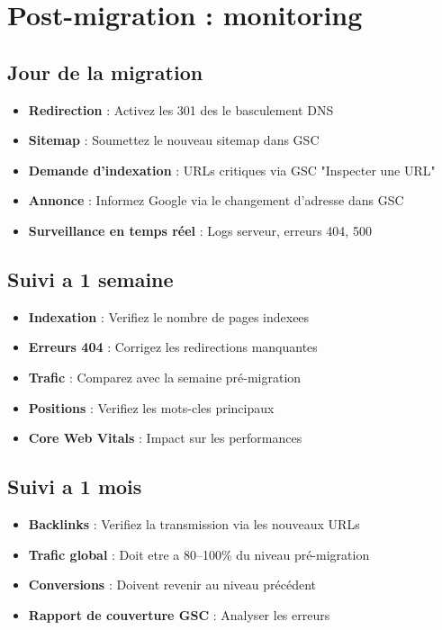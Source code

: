 \section{Post-migration : monitoring}

\subsection{Jour de la migration}

\begin{itemize}
    \item \textbf{Redirection} : Activez les 301 des le basculement DNS
    \item \textbf{Sitemap} : Soumettez le nouveau sitemap dans GSC
    \item \textbf{Demande d'indexation} : URLs critiques via GSC "Inspecter une URL"
    \item \textbf{Annonce} : Informez Google via le changement d'adresse dans GSC
    \item \textbf{Surveillance en temps réel} : Logs serveur, erreurs 404, 500
\end{itemize}

\subsection{Suivi a 1 semaine}

\begin{itemize}
    \item \textbf{Indexation} : Verifiez le nombre de pages indexees
    \item \textbf{Erreurs 404} : Corrigez les redirections manquantes
    \item \textbf{Trafic} : Comparez avec la semaine pré-migration
    \item \textbf{Positions} : Verifiez les mots-cles principaux
    \item \textbf{Core Web Vitals} : Impact sur les performances
\end{itemize}

\subsection{Suivi a 1 mois}

\begin{itemize}
    \item \textbf{Backlinks} : Verifiez la transmission via les nouveaux URLs
    \item \textbf{Trafic global} : Doit etre a 80--100\% du niveau pré-migration
    \item \textbf{Conversions} : Doivent revenir au niveau précédent
    \item \textbf{Rapport de couverture GSC} : Analyser les erreurs
\end{itemize}


